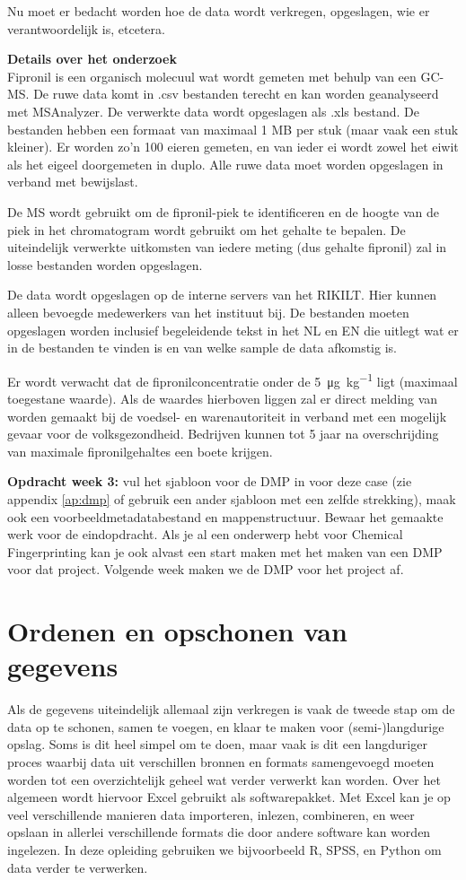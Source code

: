 Nu moet er bedacht worden hoe de data wordt verkregen, opgeslagen, wie er verantwoordelijk is, etcetera.

\textbf{Details over het onderzoek}\\
Fipronil is een organisch molecuul wat wordt gemeten met behulp van een GC-MS. De ruwe data komt in .csv bestanden terecht en kan worden geanalyseerd met MSAnalyzer. De verwerkte data wordt opgeslagen als .xls bestand. De bestanden hebben een formaat van maximaal 1 MB per stuk (maar vaak een stuk kleiner). Er worden zo'n 100 eieren gemeten, en van ieder ei wordt zowel het eiwit als het eigeel doorgemeten in duplo. Alle ruwe data moet worden opgeslagen in verband met bewijslast. 

De MS wordt gebruikt om de fipronil-piek te identificeren en de hoogte van de piek in het chromatogram wordt gebruikt om het gehalte te bepalen. De uiteindelijk verwerkte uitkomsten van iedere meting (dus gehalte fipronil) zal in losse bestanden worden opgeslagen. 

De data wordt opgeslagen op de interne servers van het RIKILT. Hier kunnen alleen bevoegde medewerkers van het instituut bij. De bestanden moeten opgeslagen worden inclusief begeleidende tekst in het NL en EN die uitlegt wat er in de bestanden te vinden is en van welke sample de data afkomstig is. 

Er wordt verwacht dat de fipronilconcentratie onder de \SI[per-mode=symbol]{5}{\micro\gram\per\kilo\gram} ligt (maximaal toegestane waarde). Als de waardes hierboven liggen zal er direct melding van worden gemaakt bij de voedsel- en warenautoriteit in verband met een mogelijk gevaar voor de volksgezondheid. Bedrijven kunnen tot 5 jaar na overschrijding van maximale fipronilgehaltes een boete krijgen. 

\color{saxion}\textbf{Opdracht week 3: }\color{black} vul het sjabloon voor de DMP in voor deze case (zie appendix \ref{ap:dmp} of gebruik een ander sjabloon met een zelfde strekking), maak ook een voorbeeldmetadatabestand en mappenstructuur. Bewaar het gemaakte werk voor de eindopdracht. Als je al een onderwerp hebt voor Chemical Fingerprinting kan je ook alvast een start maken met het maken van een DMP voor dat project. Volgende week maken we de DMP voor het project af. 

\newpage
\section{Ordenen en opschonen van gegevens}
Als de gegevens uiteindelijk allemaal zijn verkregen is vaak de tweede stap om de data op te schonen, samen te voegen, en klaar te maken voor (semi-)langdurige opslag. Soms is dit heel simpel om te doen, maar vaak is dit een langduriger proces waarbij data uit verschillen bronnen en formats samengevoegd moeten worden tot een overzichtelijk geheel wat verder verwerkt kan worden.
Over het algemeen wordt hiervoor Excel gebruikt als softwarepakket. Met Excel kan je op veel verschillende manieren data importeren, inlezen, combineren, en weer opslaan in allerlei verschillende formats die door andere software kan worden ingelezen. In deze opleiding gebruiken we bijvoorbeeld R, SPSS, en Python om data verder te verwerken.

